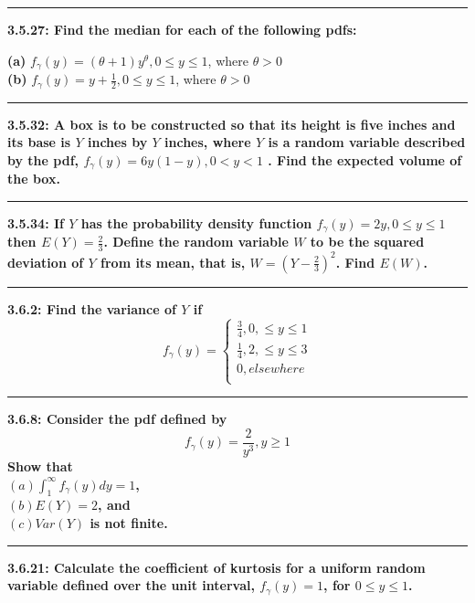 \documentclass[11pt]{article}
\newcommand\question[2]{\vspace{.25in}\hrule\textbf{#1: #2}\vspace{.5em}\vspace{.10in}}
\renewcommand\part[1]{\vspace{.10in}\textbf{(#1)}}
\begin{document}
\question{3.5.27}
{Find the median for each of the following pdfs:}

\part{a} $f_{\gamma} (y) = (\theta + 1)y^{\theta}, 0 \leq y \leq 1$, where $\theta > 0$
\\ 
\part{b} $f_{\gamma} (y) = y + \frac{1}{2}, 0 \leq y \leq 1$, where $\theta > 0$


\question{3.5.32}
{A box is to be constructed so that its height is five inches and its base is
$Y$ inches by $Y$ inches, where $Y$ is a random variable described by the pdf,
$f_{\gamma}(y) = 6y(1-y),0 < y < 1$
. Find the expected volume of the box.}


\question{3.5.34}
{If $Y$ has the probability density function 
$f_{\gamma} (y) = 2y, 0 \leq y \leq 1$
then $E(Y) = \frac{2}{3}$. Define the random variable $W$ to be the squared deviation
of $Y$ from its mean, that is, $W = (Y-\frac{2}{3})^{2}$. Find $E(W)$.}


\question{3.6.2}
{Find the variance of $Y$ if 
\[
    f_{\gamma} (y) =
        \begin{cases}
            \frac{3}{4}, 0, \leq y \leq 1 \\
            \frac{1}{4}, 2, \leq y \leq 3 \\
            0, elsewhere \\
        \end{cases}
\]}


\question{3.6.8}
{Consider the pdf defined by 
    \[
        f_{\gamma}(y) = \frac{2}{y^{3}}, y \geq 1
    \]
Show that \\
$(a) \int_{1}^{\infty} f_{\gamma}(y) dy = 1$, \\
$(b) E(Y) = 2$, and \\
$(c) Var(Y)$ is not finite.
}


\question{3.6.21}
{Calculate the coefficient of kurtosis for a uniform random variable defined
over the unit interval, $f_{\gamma}(y) = 1$, for $0 \leq y \leq 1$. }
\end{document}
